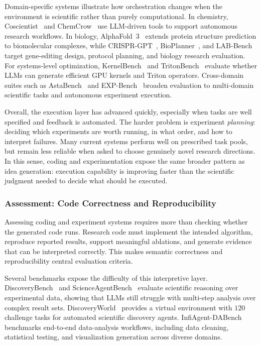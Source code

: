 \documentclass{llmxive}
\begin{document}
Domain-specific systems illustrate how orchestration changes when the environment is scientific rather than purely computational. In chemistry, Coscientist~\cite{boiko2023coscientist} and ChemCrow~\cite{bran2024chemcrow} use LLM-driven tools to support autonomous research workflows. In biology, AlphaFold~3~\cite{abramson2024alphafold3} extends protein structure prediction to biomolecular complexes, while CRISPR-GPT~\cite{crisprgpt2024}, BioPlanner~\cite{bioplanner2024}, and LAB-Bench~\cite{labbench2024} target gene-editing design, protocol planning, and biology research evaluation. For systems-level optimization, KernelBench~\cite{kernelbench2025} and TritonBench~\cite{tritonbench2025} evaluate whether LLMs can generate efficient GPU kernels and Triton operators. Cross-domain suites such as AstaBench~\cite{astabench2025} and EXP-Bench~\cite{expbench2025} broaden evaluation to multi-domain scientific tasks and autonomous experiment execution.

Overall, the execution layer has advanced quickly, especially when tasks are well specified and feedback is automated. The harder problem is experiment \emph{planning}: deciding which experiments are worth running, in what order, and how to interpret failures. Many current systems perform well on prescribed task pools, but remain less reliable when asked to choose genuinely novel research directions. In this sense, coding and experimentation expose the same broader pattern as idea generation: execution capability is improving faster than the scientific judgment needed to decide what should be executed.



\subsubsection{Assessment: Code Correctness and Reproducibility}
\label{sec:exp_analysis}

Assessing coding and experiment systems requires more than checking whether the generated code runs. Research code must implement the intended algorithm, reproduce reported results, support meaningful ablations, and generate evidence that can be interpreted correctly. This makes semantic correctness and reproducibility central evaluation criteria.

Several benchmarks expose the difficulty of this interpretive layer. DiscoveryBench~\cite{majumder2024discoverybench} and ScienceAgentBench~\cite{scienceagentbench2024} evaluate scientific reasoning over experimental data, showing that LLMs still struggle with multi-step analysis over complex result sets. DiscoveryWorld~\cite{discoveryworld2024} provides a virtual environment with $120$ challenge tasks for automated scientific discovery agents. InfiAgent-DABench~\cite{infidabench2024} benchmarks end-to-end data-analysis workflows, including data cleaning, statistical testing, and visualization generation across diverse domains.
\end{document}
